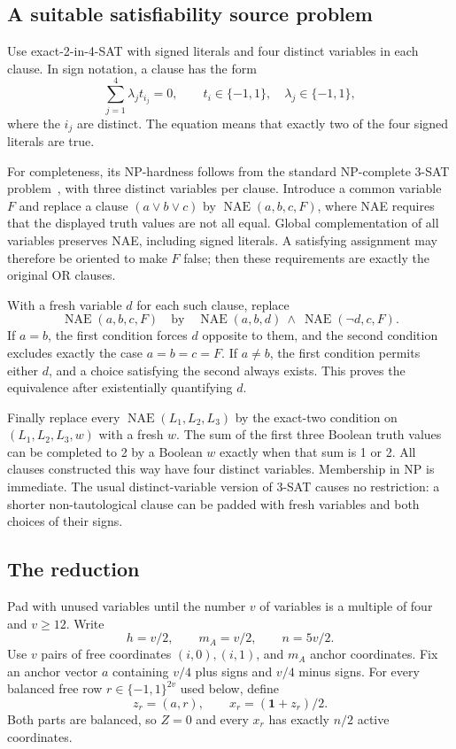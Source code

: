 \documentclass[11pt,a4paper]{article}
\theoremstyle{remark}
\newcommand{\1}{\mathbf 1}
\begin{document}
\subsection{A suitable satisfiability source problem}

Use exact-2-in-4-SAT with signed literals and four distinct variables in each
clause. In sign notation, a clause has the form
\begin{equation}\label{eq:exacttwo}
 \sum_{j=1}^4\lambda_j t_{i_j}=0,
 \qquad t_i\in\{-1,1\},\quad\lambda_j\in\{-1,1\},
\end{equation}
where the $i_j$ are distinct. The equation means that exactly two of the
four signed literals are true.

For completeness, its NP-hardness follows from the standard NP-complete
3-SAT problem~\cite{cook1971}, with three distinct
variables per clause. Introduce a common variable $F$ and replace a clause
$(a\lor b\lor c)$ by $\operatorname{NAE}(a,b,c,F)$, where NAE requires that
the displayed truth values are not all equal. Global complementation of all
variables preserves NAE, including signed literals. A satisfying assignment
may therefore be oriented to make $F$ false; then these requirements are
exactly the original OR clauses.

With a fresh variable $d$ for each such clause, replace
\[
 \operatorname{NAE}(a,b,c,F)
 \quad\text{by}\quad
 \operatorname{NAE}(a,b,d)\ \land\
 \operatorname{NAE}(\neg d,c,F).
\]
If $a=b$, the first condition forces $d$ opposite to them, and the second
condition excludes exactly the case $a=b=c=F$. If $a\ne b$, the first
condition permits either $d$, and a choice satisfying the second always
exists. This proves the equivalence after existentially quantifying $d$.

Finally replace every $\operatorname{NAE}(L_1,L_2,L_3)$ by the exact-two
condition on $(L_1,L_2,L_3,w)$ with a fresh $w$. The sum of the first three
Boolean truth values can be completed to 2 by a Boolean $w$ exactly when
that sum is 1 or 2. All clauses constructed this way have four distinct
variables. Membership in NP is immediate. The usual distinct-variable
version of 3-SAT causes no restriction: a shorter non-tautological clause
can be padded with fresh variables and both choices of their signs.

\subsection{The reduction}

Pad with unused variables until the number $v$ of variables is a multiple
of four and $v\ge12$. Write
\[
 h=v/2,\qquad m_A=v/2,\qquad n=5v/2.
\]
Use $v$ pairs of free coordinates $(i,0),(i,1)$, and $m_A$ anchor coordinates.
Fix an anchor vector $a$ containing $v/4$ plus signs and $v/4$ minus signs.
For every balanced free row $r\in\{-1,1\}^{2v}$ used below, define
\begin{equation}\label{eq:reductionrow}
 z_r=(a,r),\qquad x_r=(\1+z_r)/2.
\end{equation}
Both parts are balanced, so $Z=0$ and every $x_r$ has exactly $n/2$ active
coordinates.
\end{document}
